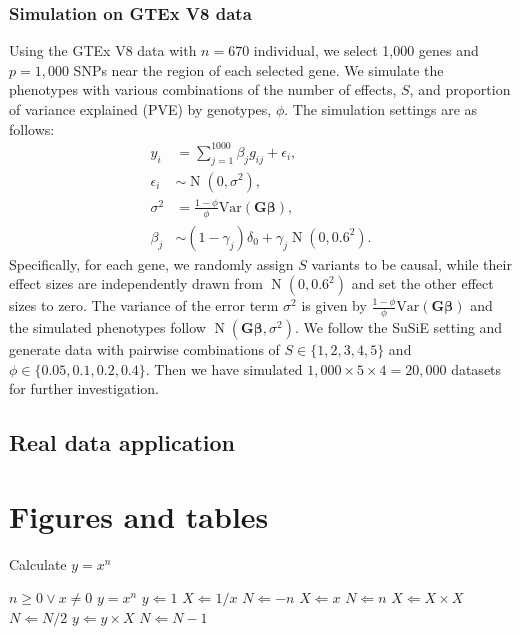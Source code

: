 \documentclass[pdflatex,sn-mathphys-num]{sn-jnl}%
\theoremstyle{thmstyleone}%
\theoremstyle{thmstyletwo}%
\theoremstyle{thmstylethree}%
\begin{document}
\subsubsection{Simulation on GTEx V8 data}
Using the GTEx V8 data \cite{gtex2015genotype} with $n=670$ individual, we select 1,000 genes and $p=1,000$ SNPs near the region of each selected gene. We simulate the phenotypes with various combinations of the number of effects, $S$, and proportion of variance explained (PVE) by genotypes, $\phi$. The simulation settings are as follows:
\begin{align}
    y_i &= \sum_{j=1}^{1000} \beta_j g_{ij}  + \epsilon_i,\\
    \epsilon_i &\sim \operatorname{N}(0, \sigma^2),\\
    \sigma^2 &= \frac{1-\phi}{\phi}\text{Var}(\mathbf{G}\boldsymbol{\beta}),\\
    \beta_j  &\sim (1-\gamma_j)\delta_0 + \gamma_j\operatorname{N}\left(0, 0.6^2\right).
\end{align}
Specifically, for each gene, we randomly assign $S$ variants to be causal, while their effect sizes are independently drawn from $\operatorname{N}(0, 0.6^2)$ and set the other effect sizes to zero. The variance of the error term $\sigma^2$ is given by $\frac{1-\phi}{\phi}\text{Var}(\mathbf{G}\boldsymbol{\beta})$ and the simulated phenotypes follow $\operatorname{N}(\mathbf{G}\boldsymbol{\beta}, \sigma^2)$. We follow the SuSiE setting and generate data with pairwise combinations of $S \in \{1,2,3,4,5\}$ and $\phi \in \{0.05,0.1,0.2,0.4\}$. Then we have simulated $1,000\times 5 \times 4 = 20,000$ datasets for further investigation.



\subsection{Real data application}\label{subsec3}





\newpage
\section{Figures and tables}\label{sec6}



\begin{algorithm}
\caption{Calculate $y = x^n$}\label{algo1}
\begin{algorithmic}[1]
\Require $n \geq 0 \vee x \neq 0$
\Ensure $y = x^n$ 
\State $y \Leftarrow 1$
\label{algln2}
        \State $X \Leftarrow 1 / x$
        \State $N \Leftarrow -n$
\Else
        \State $X \Leftarrow x$
        \State $N \Leftarrow n$
\EndIf
{}
            \State $X \Leftarrow X \times X$
            \State $N \Leftarrow N / 2$
        \Else[$N$ is odd]
            \State $y \Leftarrow y \times X$
            \State $N \Leftarrow N - 1$
        \EndIf
\EndWhile
\end{algorithmic}
\end{algorithm}





\newpage

\end{document}

